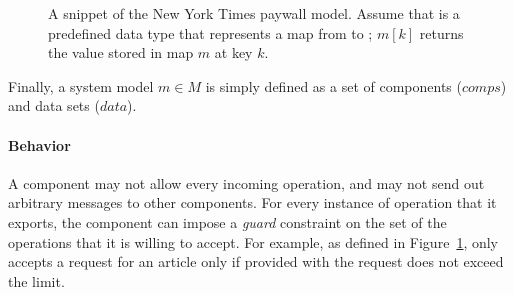 \begin{figure}[!t]










\caption{A snippet of the New York Times paywall model. Assume that
   is a predefined data type that represents a map
  from  to ; $m[k]$ returns the value stored in
  map $m$ at key $k$.}
\label{fig-nytimes-spec}
\end{figure}

Finally, a system model $m \in M$ is
simply defined as a set of components ($comps$) and data sets
($data$). 

\paragraph{\textbf{Behavior}} A component may not allow every incoming
operation, and may not send out arbitrary messages to other
components. For every instance of operation that it exports, the
component can impose a \textit{guard} constraint on the set of the
operations that it is willing to accept. For example, as defined in
Figure~\ref{fig-nytimes-spec},  only accepts a request
for an article only if  provided with the request
does not exceed the limit.

